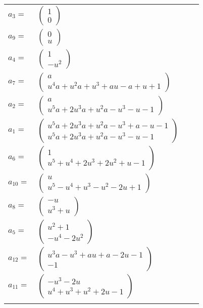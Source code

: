 \documentclass[1p]{elsarticle_modified}
\theoremstyle{definition}
\begin{document}
\begin{tabular}{m{7pt} m{180pt} m{7pt} m{180pt} }
\flushright $a_{3}=$&$\begin{pmatrix}1\\0\end{pmatrix}$ \\
\flushright $a_{9}=$&$\begin{pmatrix}0\\u\end{pmatrix}$ \\
\flushright $a_{4}=$&$\begin{pmatrix}1\\- u^2\end{pmatrix}$ \\
\flushright $a_{7}=$&$\begin{pmatrix}a\\u^4 a+u^2 a+u^3+a u- a+u+1\end{pmatrix}$ \\
\flushright $a_{2}=$&$\begin{pmatrix}a\\u^5 a+2 u^3 a+u^2 a- u^3- u-1\end{pmatrix}$ \\
\flushright $a_{1}=$&$\begin{pmatrix}u^5 a+2 u^3 a+u^2 a- u^3+a- u-1\\u^5 a+2 u^3 a+u^2 a- u^3- u-1\end{pmatrix}$ \\
\flushright $a_{6}=$&$\begin{pmatrix}1\\u^5+u^4+2 u^3+2 u^2+u-1\end{pmatrix}$ \\
\flushright $a_{10}=$&$\begin{pmatrix}u\\u^5- u^4+u^3- u^2-2 u+1\end{pmatrix}$ \\
\flushright $a_{8}=$&$\begin{pmatrix}- u\\u^3+u\end{pmatrix}$ \\
\flushright $a_{5}=$&$\begin{pmatrix}u^2+1\\- u^4-2 u^2\end{pmatrix}$ \\
\flushright $a_{12}=$&$\begin{pmatrix}u^3 a- u^3+a u+a-2 u-1\\-1\end{pmatrix}$ \\
\flushright $a_{11}=$&$\begin{pmatrix}- u^3-2 u\\u^4+u^3+u^2+2 u-1\end{pmatrix}$\\&\end{tabular}
\end{document}
